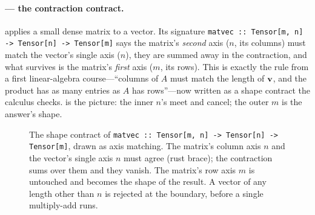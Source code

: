\paragraph{ --- the contraction contract.}
 applies a small dense matrix to a vector. Its signature
\lstinline[style=l4style]|matvec :: Tensor[m, n] -> Tensor[n] -> Tensor[m]| says
the matrix's \emph{second} axis ($n$, its columns) must match the vector's single
axis ($n$), they are summed away in the contraction, and what survives is the
matrix's \emph{first} axis ($m$, its rows). This is exactly the rule from a first
linear-algebra course---``columns of $A$ must match the length of $\mathbf{v}$, and the
product has as many entries as $A$ has rows''---now written as a shape contract
the calculus checks.  is the picture: the inner $n$'s
meet and cancel; the outer $m$ is the answer's shape.

\begin{figure}[t]
\centering
{}
\caption[Shape matching at a  boundary]{The shape contract of
\lstinline[style=l4style]|matvec :: Tensor[m, n] -> Tensor[n] -> Tensor[m]|, drawn
as axis matching. The matrix's column axis $n$ and the vector's single axis $n$
must agree (rust brace); the contraction sums over them and they vanish. The
matrix's row axis $m$ is untouched and becomes the shape of the result. A vector
of any length other than $n$ is rejected at the boundary, before a single
multiply-add runs.}
\label{fig:t-shapematch}
\end{figure}

